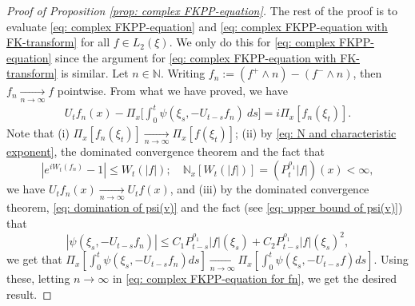 \documentclass[EJP]{ejpecp} %
\begin{document}
\begin{proof}[Proof of Proposition \ref{prop: complex FKPP-equation}]
  The rest of the proof is to evaluate \eqref{eq: complex FKPP-equation} and \eqref{eq: complex FKPP-equation with FK-transform} for all $f\in L_2(\xi)$. We only do this for \eqref{eq: complex FKPP-equation} since the argument for \eqref{eq: complex FKPP-equation with FK-transform} is similar.
  Let $n \in \mathbb N$.
  Writing $f_n := (f^+ \wedge n) - (f^- \wedge n)$, then $f_n \xrightarrow[n\to \infty]{} f$ pointwise.
  From what we have proved, we have
  \begin{align}
    \label{eq: complex FKPP-equation for fn}
    U_tf_n(x) - \Pi_{x} \Big[\int_0^t \psi (\xi_s, - U_{t-s}f_n ) ~ds\Big]
    = i \Pi_{x} [f_n(\xi_t)].
  \end{align}
  Note that
  (i) $\Pi_{x}[f_n(\xi_t)] \xrightarrow[n\to \infty]{} \Pi_{x}[f(\xi_t)]$;
  (ii) by \eqref{eq: N and characteristic exponent}, the dominated convergence theorem and the fact that
  \[
     |e^{i W_t(f_n)} - 1| \leq W_t(|f|);
    \quad \mathbb N_x[W_t(|f|)] = (P_t^{\rho_1} |f|)(x) < \infty,
 \]
  we have $U_tf_n(x) \xrightarrow[n\to \infty]{} U_tf(x)$, and (iii) by the dominated convergence theorem, \eqref{eq: domination of psi(v)} and the fact (see \eqref{eq: upper bound of psi(v)}) that
  \[
    |\psi(\xi_s,- U_{t-s}f_n) |
    \leq C_1 P_{t-s}^{\rho_1}|f|(\xi_s)+C_2 P_{t-s}^{\rho_1}|f|(\xi_s)^2,
  \]
  we get that $\Pi_{x} [\int_0^t \psi(\xi_s,- U_{t-s}f_n)ds] \xrightarrow[n\to \infty]{} \Pi_{x} [\int_0^t \psi(\xi_s,- U_{t-s}f)ds]$.
  Using these, letting $n \to \infty$ in \eqref{eq: complex FKPP-equation for fn}, we get the desired result.
\end{proof}
\end{document}
